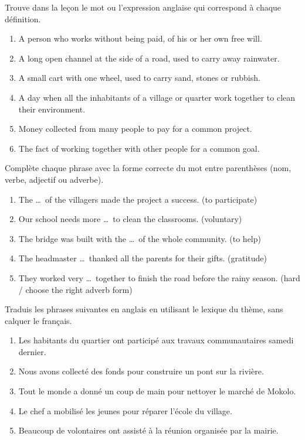 \documentclass[11pt]{article}
\newcounter{popsec}
\newcounter{popsub}
\newcommand{\courssub}[1]{%
  \stepcounter{popsub}%
  \par\vspace{9pt}\noindent{\popxbold\fontsize{11.5}{13}\selectfont\color{popink}{\color{poporange}\thepopsec.\thepopsub}\hspace{6pt}#1}\par\nopagebreak\vspace{4pt}
}
\begin{document}
\begin{exercice}
Trouve dans la leçon le mot ou l'expression anglaise qui correspond à chaque définition.

\begin{enumerate}
\item A person who works without being paid, of his or her own free will.
\item A long open channel at the side of a road, used to carry away rainwater.
\item A small cart with one wheel, used to carry sand, stones or rubbish.
\item A day when all the inhabitants of a village or quarter work together to clean their environment.
\item Money collected from many people to pay for a common project.
\item The fact of working together with other people for a common goal.
\end{enumerate}
\end{exercice}

\begin{exercice}
Complète chaque phrase avec la forme correcte du mot entre parenthèses (nom, verbe, adjectif ou adverbe).

\begin{enumerate}
\item The \ldots\ of the villagers made the project a success. (to participate)
\item Our school needs more \ldots\ to clean the classrooms. (voluntary)
\item The bridge was built with the \ldots\ of the whole community. (to help)
\item The headmaster \ldots\ thanked all the parents for their gifts. (gratitude)
\item They worked very \ldots\ together to finish the road before the rainy season. (hard / choose the right adverb form)
\end{enumerate}
\end{exercice}

\courssub{Je m'entraîne}

\begin{exercice}
Traduis les phrases suivantes en anglais en utilisant le lexique du thème, sans calquer le français.

\begin{enumerate}
\item Les habitants du quartier ont participé aux travaux communautaires samedi dernier.
\item Nous avons collecté des fonds pour construire un pont sur la rivière.
\item Tout le monde a donné un coup de main pour nettoyer le marché de Mokolo.
\item Le chef a mobilisé les jeunes pour réparer l'école du village.
\item Beaucoup de volontaires ont assisté à la réunion organisée par la mairie.
\end{enumerate}
\end{exercice}
\end{document}
